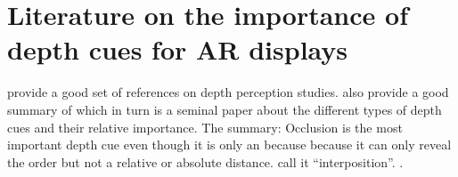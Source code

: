 \section{Literature on the importance of depth cues for AR displays}

\cite{sielhorst2008advanced} provide a good set of references on depth perception studies. \cite{sielhorst2008advanced} also provide a good summary of \cite{cutting1995perceiving} which in turn is a seminal paper about the different types of depth cues and their relative importance. The summary: Occlusion is the most important depth cue even though it is only an  because because it can only reveal the order but not a relative or absolute distance. \cite{sielhorst2008advanced} call it ``interposition''. \cite{sielhorst2008advanced}.



